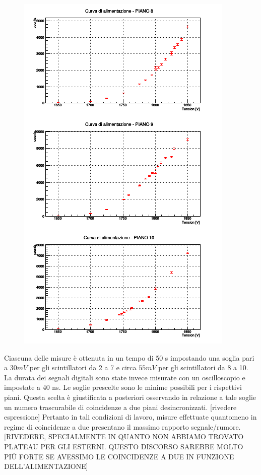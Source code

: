 \documentclass[11pt]{article}
\begin{document}
\begin{figure}
\includegraphics{"plateau_altri"}
\end{figure}

Ciascuna delle misure è ottenuta in un tempo di 50 s impostando una soglia pari a $30 mV$ per gli scintillatori da 2 a 7 e circa $55 mV$ per gli scintillatori da 8 a 10. La durata dei segnali digitali sono state invece misurate con un oscilloscopio e impostate a 40 ns. Le soglie prescelte sono le minime possibili per i rispettivi piani. Questa scelta è giustificata a posteriori osservando in relazione a tale soglie un numero trascurabile di coincidenze a due piani desincronizzati. [rivedere espressione] Pertanto in tali condizioni di lavoro, misure effettuate quantomeno in regime di coincidenze a due presentano il massimo rapporto segnale/rumore. [RIVEDERE, SPECIALMENTE IN QUANTO NON ABBIAMO TROVATO PLATEAU PER GLI ESTERNI. QUESTO DISCORSO SAREBBE MOLTO PIÙ FORTE SE AVESSIMO LE COINCIDENZE A DUE IN FUNZIONE DELL'ALIMENTAZIONE]
\end{document}
